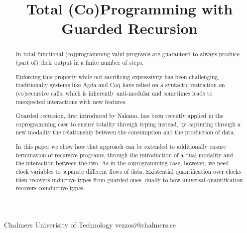 \documentclass[cm]{sigplanconf}
\begin{document}
\setlength{\pdfpageheight}{\paperheight}
\setlength{\pdfpagewidth}{\paperwidth}






\title{Total (Co)Programming with Guarded Recursion}

           {Chalmers Univerisity of Technology}
           {vezzosi@chalmers.se}

\maketitle

\begin{abstract}
In total functional (co)programming valid programs are guaranteed to
always produce (part of) their output in a finite number of steps.

Enforcing this property while not sacrificing expressivity has been
challenging, traditionally systems like Agda and Coq have relied on a
syntactic restriction on (co)recursive calls, which is inherently
anti-modular and sometimes leads to unexpected interactions with new
features.

Guarded recursion, first introduced by Nakano, has been recently
applied in the coprogramming case to ensure totality through typing
instead, by capturing through a new modality the relationship between
the consumption and the production of data.

In this paper we show how that approach can be extended to
additionally ensure termination of recursive programs, through the
introduction of a dual modality and the interaction between the
two. As in the coprogramming case, however, we need clock variables to
separate different flows of data. Existential quantification over
clocks then recovers inductive types from guarded ones, dually to how
universal quantification recovers coinductive types.


\end{abstract}
\end{document}
